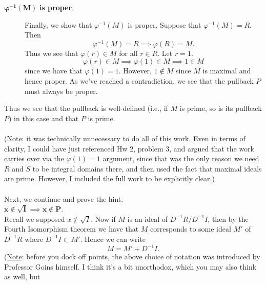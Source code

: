 \documentclass[12pt,letterpaper]{algebra_book}
\renewcommand{\phi}{\varphi}
\theoremstyle{definition}
\begin{document}
\begin{prf}
\begin{enumerate}
\begin{itemize}
\begin{description}
                    \item[$\bm{\phi^{-1}(M)}$ \textbf{is proper}.] Finally, we show
                    that $\phi^{-1}(M)$ is proper. Suppose that $\phi^{-1}(M) = R$. Then 
                    \[
                        \phi^{-1}(M) = R \implies \phi(R) = M.   
                    \]
                    Thus we see that $\phi(r) \in M$ for all $r \in R$.
                    Let $r = 1$. 
                    \[
                        \phi(r) \in M \implies \phi(1) \in M \implies 1 \in M
                    \]
                    since we have that $\phi(1) = 1$.
                    However, $1 \not\in M$ since $M$ is maximal and hence
                    proper. As we've reached a contradiction, we see that
                    the pullback $P$ must always be proper. 
                \end{description} 
            \end{itemize}
            Thus we see that the pullback is well-defined (i.e., if $M$ is
            prime, so is its pullback $P$) in this case and
            that $P$ is prime. 
            \\
            \\
            (Note: it was technically unnecessary to do all of this work.
            Even in terms of clarity, I could have just referenced Hw 2,
            problem 3, and argued that the work carries over via the
            $\phi(1) = 1$ argument, since that was the only reason we 
            need $R$ and $S$ to be integral domains there, and then used
            the fact that maximal ideals are prime. However, I included
            the full work to be explicitly clear.)
            \\
            \\
            Next, we continue and prove the hint.\\
            \underline{$\bm{x \not\in \sqrt{I} \implies x \not\in
            P}$}.\\[1.2ex]
            Recall we supposed $x \not\in \sqrt{I}$. Now
            if $M$ is an ideal of $D^{-1}R/D^{-1}I$, then by the Fourth
            Isomorphism theorem we have that $M$ corresponds to some ideal
            $M'$ of $D^{-1}R$ where $D^{-1}I \subset M'$. Hence we can
            write  
            \[
                M = M' +  D^{-1}I.
            \]
            (\underline{Note}: before you dock off points, the above choice of
            notation was introduced by Professor Goins himself. I think
            it's a bit unorthodox, which you may also think as well, but

\end{enumerate}
\end{prf}
\end{document}
